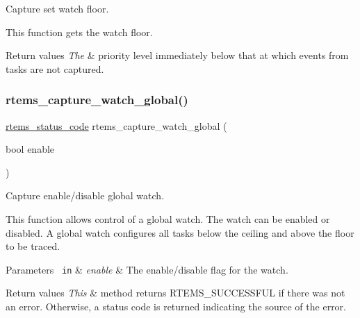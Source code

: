 Capture set watch floor. 

This function gets the watch floor.


\begin{DoxyRetVals}{Return values}
{\em The} & priority level immediately below that at which events from tasks are not captured. \\
\hline
\end{DoxyRetVals}
\mbox{\label{group__libmisc__capture_gaed2ce2569738d1553944c6cbf63717a5}} 
\subsubsection{\texorpdfstring{rtems\_capture\_watch\_global()}{rtems\_capture\_watch\_global()}}
{\footnotesize\ttfamily \mbox{\hyperlink{group__ClassicStatus_ga545d41846817eaba6143d52ee4d9e9fe}{rtems\+\_\+status\+\_\+code}} rtems\+\_\+capture\+\_\+watch\+\_\+global (\begin{DoxyParamCaption}\item[{bool}]{enable }\end{DoxyParamCaption})}



Capture enable/disable global watch. 

This function allows control of a global watch. The watch can be enabled or disabled. A global watch configures all tasks below the ceiling and above the floor to be traced.


\begin{DoxyParams}[1]{Parameters}
\mbox{\texttt{ in}}  & {\em enable} & The enable/disable flag for the watch.\\
\hline
\end{DoxyParams}

\begin{DoxyRetVals}{Return values}
{\em This} & method returns R\+T\+E\+M\+S\+\_\+\+S\+U\+C\+C\+E\+S\+S\+F\+UL if there was not an error. Otherwise, a status code is returned indicating the source of the error. \\
\hline
\end{DoxyRetVals}
\mbox{\label{group__libmisc__capture_ga59613c1b9451ff9fc8d15cf9ecb5bb98}} 
